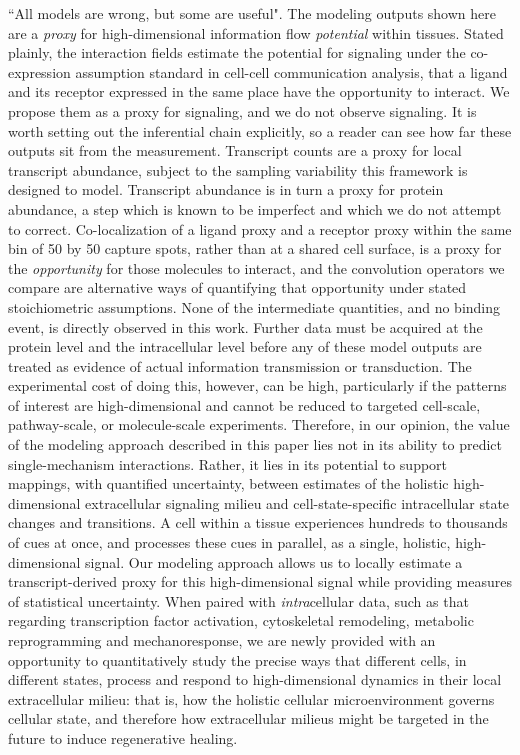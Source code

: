 \documentclass[10pt,letterpaper]{article}
\begin{document}
``All models are wrong, but some are useful". The modeling outputs shown here are a \textit{proxy} for high-dimensional information flow \textit{potential} within tissues. Stated plainly, the interaction fields estimate the potential for signaling under the co-expression assumption standard in cell-cell communication analysis, that a ligand and its receptor expressed in the same place have the opportunity to interact. We propose them as a proxy for signaling, and we do not observe signaling. It is worth setting out the inferential chain explicitly, so a reader can see how far these outputs sit from the measurement. Transcript counts are a proxy for local transcript abundance, subject to the sampling variability this framework is designed to model. Transcript abundance is in turn a proxy for protein abundance, a step which is known to be imperfect and which we do not attempt to correct. Co-localization of a ligand proxy and a receptor proxy within the same bin of 50 by 50 capture spots, rather than at a shared cell surface, is a proxy for the \textit{opportunity} for those molecules to interact, and the convolution operators we compare are alternative ways of quantifying that opportunity under stated stoichiometric assumptions. None of the intermediate quantities, and no binding event, is directly observed in this work. Further data must be acquired at the protein level and the intracellular level before any of these model outputs are treated as evidence of actual information transmission or transduction. The experimental cost of doing this, however, can be high, particularly if the patterns of interest are high-dimensional and cannot be reduced to targeted cell-scale, pathway-scale, or molecule-scale experiments. Therefore, in our opinion, the value of the modeling approach described in this paper lies not in its ability to predict single-mechanism interactions. Rather, it lies in its potential to support mappings, with quantified uncertainty, between estimates of the holistic high-dimensional extracellular signaling milieu and cell-state-specific intracellular state changes and transitions. A cell within a tissue experiences hundreds to thousands of cues at once, and processes these cues in parallel, as a single, holistic, high-dimensional signal. Our modeling approach allows us to locally estimate a transcript-derived proxy for this high-dimensional signal while providing measures of statistical uncertainty. When paired with \textit{intra}cellular data, such as that regarding transcription factor activation, cytoskeletal remodeling, metabolic reprogramming and mechanoresponse, we are newly provided with an opportunity to quantitatively study the precise ways that different cells, in different states, process and respond to high-dimensional dynamics in their local extracellular milieu: that is, how the holistic cellular microenvironment governs cellular state, and therefore how extracellular milieus might be targeted in the future to induce regenerative healing.
\end{document}
